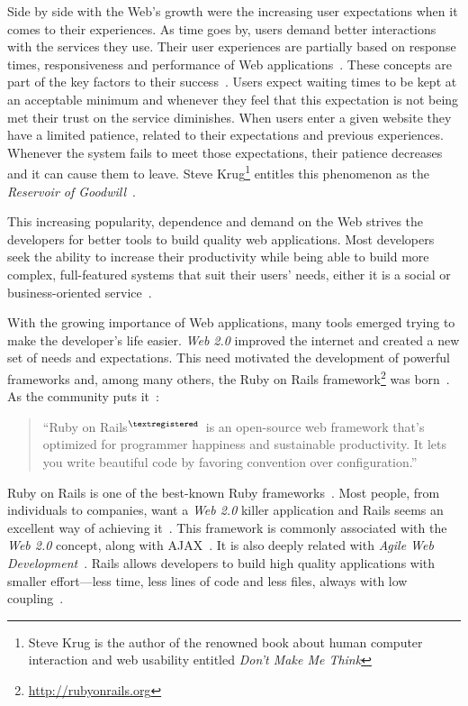 Side by side with the Web's growth were the increasing user expectations when it comes to their experiences. As time goes by, users demand better interactions with the services they use. Their user experiences are partially based on response times, responsiveness and performance of Web applications~\cite{prioritizing_web_usability}. These concepts are part of the key factors to their success~\cite{responsiveness}. Users expect waiting times to be kept at an acceptable minimum and whenever they feel that this expectation is not being met their trust on the service diminishes. When users enter a given website they have a limited patience, related to their expectations and previous experiences. Whenever the system fails to meet those expectations, their patience decreases and it can cause them to leave. Steve Krug\footnote{Steve Krug is the author of the renowned book about human computer interaction and web usability entitled \textit{Don't Make Me Think}} entitles this phenomenon as the \textit{Reservoir of Goodwill}~\cite{dont_make_me_think}.

This increasing popularity, dependence and demand on the Web strives the developers for better tools to build quality web applications. Most developers seek the ability to increase their productivity while being able to build more complex, full-featured systems that suit their users' needs, either it is a social or business-oriented service~\cite{comparison_agile_frameworks}.

With the growing importance of Web applications, many tools emerged trying to make the developer's life easier. \textit{Web 2.0} improved the internet and created a new set of needs and expectations. This need motivated the development of powerful frameworks and, among many others, the Ruby on Rails framework\footnote{\url{http://rubyonrails.org}} was born~\cite{what_is_web20}. As the community puts it~\cite{rubyonrails}:
\begin{quote}
  ``Ruby on Rails$^{\scriptsize \textregistered}$~is an open-source web framework that's optimized for programmer happiness and sustainable productivity. It lets you write beautiful code by favoring convention over configuration.''
\end{quote}
Ruby on Rails is one of the best-known Ruby frameworks~\cite{agile_webdevelopment_with_rails}. Most people, from individuals to companies, want a \textit{Web 2.0} killer application and Rails seems an excellent way of achieving it~\cite{oo_business_models}. This framework is commonly associated with the \textit{Web 2.0} concept, along with AJAX~\cite{spaghetti_code}. It is also deeply related with \textit{Agile Web Development}~\cite{agile_webdevelopment_with_rails}. Rails allows developers to build high quality applications with smaller effort---less time, less lines of code and less files, always with low coupling~\cite{maintainability_web_applications_j2ee_dotnet_ror}.

